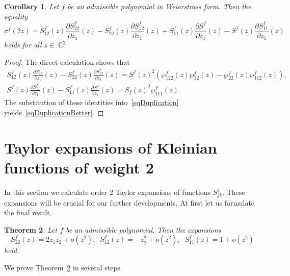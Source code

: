 \documentclass{amsart}
\numberwithin{equation}{section}
\newtheorem{theorem}{Theorem}[section]
\newtheorem{corollary}[theorem]{Corollary}
\theoremstyle{definition}
\theoremstyle{remark}
\DeclareMathOperator{\CC}{\mathbb C}
\begin{document}
	\begin{corollary}\label{corBetterDuplication}
		Let $f$ be an admissible polynomial in Weierstrass form. Then the equality
		\begin{equation}\label{eqDuplicationBetter}
			\sigma^f(2z) = S_{12}^f(z)\frac{\partial S_{22}^f}{\partial z_1}(z) - S_{22}^f(z)\frac{\partial S_{12}^f}{\partial z_1}(z) + S_{11}^f(z)\frac{\partial S^f}{\partial z_1}(z) - S^f(z)\frac{\partial S_{11}^f}{\partial z_1}(z)
		\end{equation}
		holds for all $z \in \CC^2$.
	\end{corollary}
	\begin{proof}
		The direct calculation shows that \[
		\begin{gathered}
			S_{12}^f(z)\frac{\partial S_{22}^f}{\partial z_1}(z) - S_{22}^f(z)\frac{\partial S_{12}^f}{\partial z_1}(z) = S^f(z)^2\left(\wp_{122}^f(z)\wp_{12}^f(z) - \wp_{22}^f(z)\wp_{112}^f(z)\right),\\
			S^f(z)\frac{\partial S_{11}^f}{\partial z_1}(z) - S_{11}^f(z)\frac{\partial S^f}{\partial z_1}(z) = S_f(z)^2 \wp_{111}^f(z).
		\end{gathered}
		\]
		The substitution of these identities into~\eqref{eqDuplication} yields~\eqref{eqDuplicationBetter}.
	\end{proof}
	
	\section{Taylor expansions of Kleinian functions of weight 2}\label{secTaylorExpansions}
	
	In this section we calculate order $2$ Taylor expansions of functions $S_{jk}^f$. These expansions will be crucial for our further developments. At first let us formulate the final result.
	
	\begin{theorem}\label{thTaylorExpansions}
		Let $f$ be an admissible polynomial. Then the expansions
		\begin{equation}\label{eqTaylorExpansions}
			S_{22}^f(z) = 2z_1z_2 + \bar{o}(z^2),\;\;
			S_{12}^f(z) = -z_2^2 + \bar{o}(z^2),\;\;
			S_{11}^f(z) = 1 + \bar{o}(z^2)
		\end{equation}
		hold.
	\end{theorem}
	
	We prove Theorem~\ref{thTaylorExpansions} in several steps.
	
\end{document}
